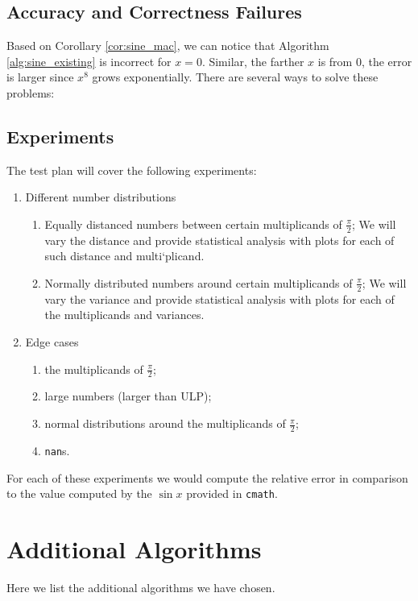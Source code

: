 \documentclass[12pt]{article}
\begin{document}
\subsection{Accuracy and Correctness Failures} \label{subsec:acc_and_corr}
Based on Corollary \ref{cor:sine_mac}, we can notice that Algorithm \ref{alg:sine_existing} is incorrect for $x = 0$.
Similar, the farther $x$ is from 0, the error is larger since $x^8$ grows exponentially.
There are several ways to solve these problems:

\subsection{Experiments}


The test plan will cover the following experiments:
\begin{enumerate}
    \item Different number distributions
    \begin{enumerate}
        \item Equally distanced numbers between certain multiplicands of $\frac{\pi}{2}$; We will vary the distance and provide statistical analysis with plots for each of such distance and multi`plicand.
        \item Normally distributed numbers around certain multiplicands of $\frac{\pi}{2}$; We will vary the variance and provide statistical analysis with plots for each of the multiplicands and variances.
    \end{enumerate}
    \item Edge cases
        \begin{enumerate}
            \item the multiplicands of $\frac{\pi}{2}$;
            \item large numbers (larger than ULP);
            \item normal distributions around the multiplicands of $\frac{\pi}{2}$;
            \item \texttt{nan}s.
        \end{enumerate}
\end{enumerate}
For each of these experiments we would compute the relative error in comparison to the value computed by the $\sin x$ provided in \texttt{cmath}.
\newpage
\section{Additional Algorithms}
Here we list the additional algorithms we have chosen.
\end{document}
